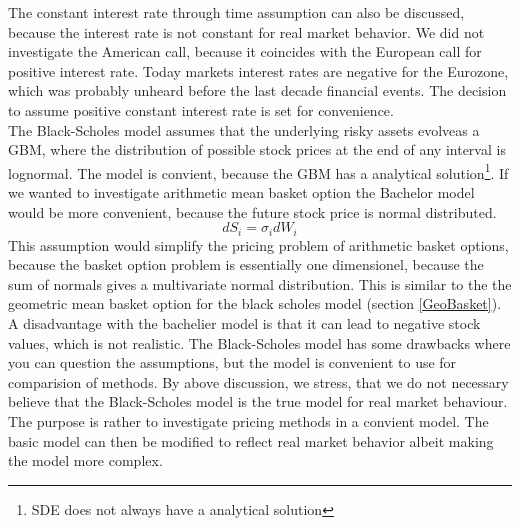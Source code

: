 The constant interest rate through time assumption can also be discussed, because the interest rate is not constant for real market behavior. We did not investigate the American call, because it coincides with the European call for positive interest rate. Today markets interest rates are negative for the Eurozone, which was probably unheard before the last decade financial events. The decision to assume positive constant interest rate is set for convenience.\\

The Black-Scholes model assumes that the underlying risky assets evolveas a GBM, where the distribution of possible stock prices at the end of any interval is lognormal. The model is convient, because the GBM has a analytical solution\footnote{SDE does not always have a analytical solution}. If we wanted to investigate arithmetic mean basket option the Bachelor model would be more convenient, because the future stock price is normal distributed. 
\begin{equation*}
dS_i=\sigma_i dW_i
\end{equation*}
This assumption would simplify the pricing problem of arithmetic basket options, because the basket option problem is essentially one dimensionel, because the sum of normals gives a multivariate normal distribution. This is similar to the the geometric mean basket option for the black scholes model (section \ref{GeoBasket}). A disadvantage with the bachelier model is that it can lead to negative stock values, which is not realistic. The Black-Scholes model has some drawbacks where you can question the assumptions, but the model is convenient to use for comparision of methods. By above discussion, we stress, that we do not necessary believe that the Black-Scholes model is the true model for real market behaviour. The purpose is rather to investigate pricing methods in a convient model. The basic model can then be modified to reflect real market behavior albeit making the model more complex.

